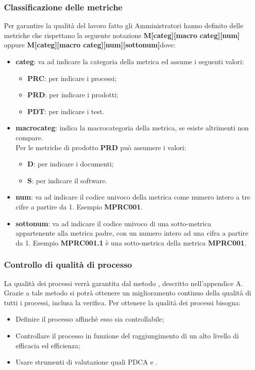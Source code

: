 \subsubsection{Classificazione delle metriche}
Per garantire la qualità del lavoro fatto gli Amministratori hanno definito delle metriche che rispettano la seguente notazione \textbf{M[categ][macro categ][num]} oppure \textbf{M[categ][macro categ][num][sottonum]}dove:
\begin{itemize}
    \item \textbf{categ}: va ad indicare la categoria della metrica ed assume i seguenti valori:
    \begin{itemize}
        \item \textbf{PRC}: per indicare i processi;
        \item \textbf{PRD}: per indicare i prodotti;
        \item \textbf{PDT}: per indicare i test.
    \end{itemize} 
\end{itemize}
\begin{itemize}
    \item \textbf{macrocateg}: indica la macrocategoria della metrica, se esiste altrimenti non compare.\\
    Per le metriche di prodotto \textbf{PRD} può assumere i valori:
    \begin{itemize}
        \item \textbf{D}: per indicare i documenti;
        \item \textbf{S}: per indicare il software.
    \end{itemize}
\end{itemize}
\begin{itemize}
    \item \textbf{num}: va ad indicare il codice univoco della metrica come numero intero a tre cifre a partire da 1. Esempio \textbf{MPRC001}.
    \item \textbf{sottonum}: va ad indicare il codice univoco di una sotto-metrica appartenente alla metrica padre, con un numero intero ad una cifra a partire da 1. Esempio \textbf{MPRC001.1} è una sotto-metrica della metrica \textbf{MPRC001}.
\end{itemize}

\subsubsection{Controllo di qualità di processo}
La qualità dei processi verrà garantita dal metodo , descritto nell'appendice A. Grazie a tale metodo si potrà ottenere un miglioramento continuo della qualità di tutti i processi, inclusa la verifica. Per ottenere la qualità dei processi bisogna:
\begin{itemize}
    \item Definire il processo affinchè esso sia controllabile;
    \item Controllare il processo in funzione del raggiungimento di un alto livello di efficacia ed efficienza;
    \item Usare strumenti di valutazione quali PDCA e .
\end{itemize}
